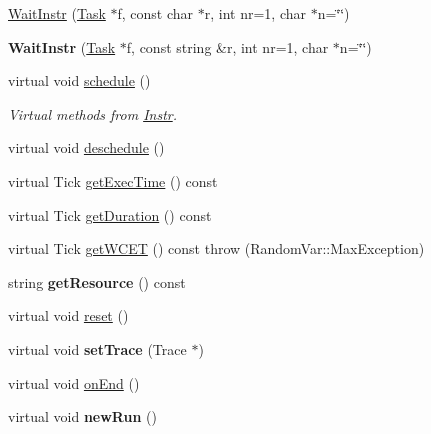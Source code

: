 \begin{DoxyCompactItemize}
\item 
\hyperlink{classRTSim_1_1WaitInstr_a91e12839abdda1dbb8b5b90a881b0c6d}{Wait\+Instr} (\hyperlink{classRTSim_1_1Task}{Task} $\ast$f, const char $\ast$r, int nr=1, char $\ast$n=\char`\"{}\char`\"{})
\item 
{\bfseries Wait\+Instr} (\hyperlink{classRTSim_1_1Task}{Task} $\ast$f, const string \&r, int nr=1, char $\ast$n=\char`\"{}\char`\"{})\hypertarget{classRTSim_1_1WaitInstr_a5442f8622f0f0789f882dcbe963d240d}{}\label{classRTSim_1_1WaitInstr_a5442f8622f0f0789f882dcbe963d240d}

\item 
virtual void \hyperlink{classRTSim_1_1WaitInstr_a7a4235cc598f6d042786cd1af29ceecb}{schedule} ()\hypertarget{classRTSim_1_1WaitInstr_a7a4235cc598f6d042786cd1af29ceecb}{}\label{classRTSim_1_1WaitInstr_a7a4235cc598f6d042786cd1af29ceecb}

\begin{DoxyCompactList}\small\item\em Virtual methods from \hyperlink{classRTSim_1_1Instr}{Instr}. \end{DoxyCompactList}\item 
virtual void \hyperlink{classRTSim_1_1WaitInstr_af5f15daeb4ac00d9a35be79d6b294625}{deschedule} ()
\item 
virtual Tick \hyperlink{classRTSim_1_1WaitInstr_a92f8503dfc5b0aa058af3e2e719a553b}{get\+Exec\+Time} () const 
\item 
virtual Tick \hyperlink{classRTSim_1_1WaitInstr_a75e1ff22b0f62363446b179b0a2d4aad}{get\+Duration} () const 
\item 
virtual Tick \hyperlink{classRTSim_1_1WaitInstr_a87fac7e397b9822f44b7b85f76279e74}{get\+W\+C\+ET} () const   throw (\+Random\+Var\+::\+Max\+Exception)
\item 
string {\bfseries get\+Resource} () const \hypertarget{classRTSim_1_1WaitInstr_a6551b9ba4a12beb8ee723b7f5eb7a59f}{}\label{classRTSim_1_1WaitInstr_a6551b9ba4a12beb8ee723b7f5eb7a59f}

\item 
virtual void \hyperlink{classRTSim_1_1WaitInstr_a189dd7fa91b3e61baf8274611c2f4fae}{reset} ()
\item 
virtual void {\bfseries set\+Trace} (Trace $\ast$)\hypertarget{classRTSim_1_1WaitInstr_aec4f42526e86e615ccfaa932411252a6}{}\label{classRTSim_1_1WaitInstr_aec4f42526e86e615ccfaa932411252a6}

\item 
virtual void \hyperlink{classRTSim_1_1WaitInstr_a6be5faadedcfba48742b522cfd7a078c}{on\+End} ()
\item 
virtual void {\bfseries new\+Run} ()\hypertarget{classRTSim_1_1WaitInstr_a1b46726d74622c36c34036dc45b8b5b4}{}\label{classRTSim_1_1WaitInstr_a1b46726d74622c36c34036dc45b8b5b4}


\end{DoxyCompactItemize}
